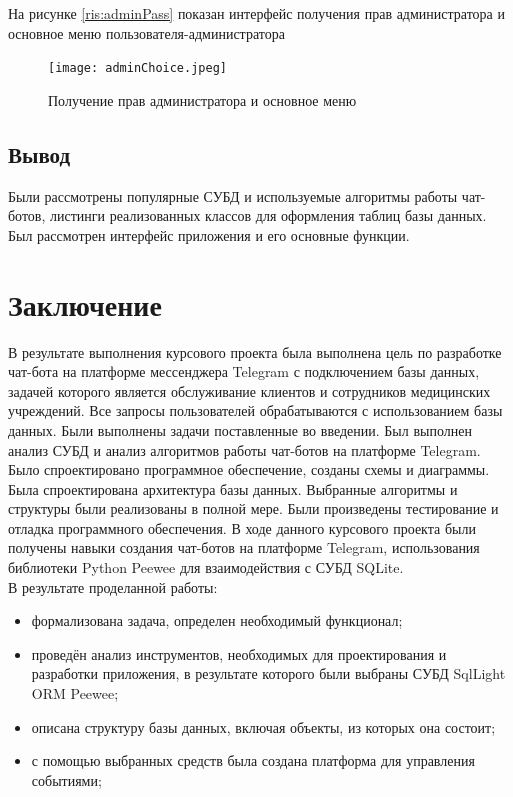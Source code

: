 \documentclass[12pt,a4paper,oneside]{report}
\begin{document}
 На рисунке \ref{ris:adminPass} показан интерфейс получения прав администратора и основное меню пользователя-администратора
 
\begin{figure}[h]
	\centering
	\texttt{[image: adminChoice.jpeg]}
	\caption{Получение прав администратора и основное меню}
	\label{ris:unregEvent}
\end{figure}

\section{Вывод}
\quad Были рассмотрены популярные СУБД и используемые алгоритмы работы чат-ботов, листинги реализованных классов для оформления таблиц базы данных. Был рассмотрен интерфейс приложения и его основные функции.

\chapter*{Заключение}
\quad В результате выполнения курсового проекта была выполнена цель по разработке чат-бота на платформе мессенджера Telegram с подключением базы данных, задачей которого является обслуживание клиентов и сотрудников медицинских учреждений. Все запросы пользователей обрабатываются с использованием базы данных.
Были выполнены задачи поставленные во введении. Был выполнен анализ СУБД и анализ алгоритмов работы чат-ботов на платформе Telegram. Было спроектировано программное обеспечение, созданы схемы и диаграммы. Была спроектирована архитектура базы данных. Выбранные алгоритмы и структуры были реализованы в полной мере. Были произведены тестирование и отладка программного обеспечения.
В ходе данного курсового проекта были получены навыки создания чат-ботов на платформе Telegram, использования библиотеки Python Peewee для взаимодействия с СУБД SQLite.
\\

В результате проделанной работы:
\begin{itemize}
	\item формализована задача, определен необходимый функционал;
	\item проведён анализ инструментов, необходимых для проектирования и разработки приложения, в результате которого были выбраны СУБД SqlLight ORM Peewee;
	\item описана структуру базы данных, включая объекты, из которых она состоит;
	\item с помощью выбранных средств была создана платформа для управления событиями;
\end{itemize}
\end{document}
